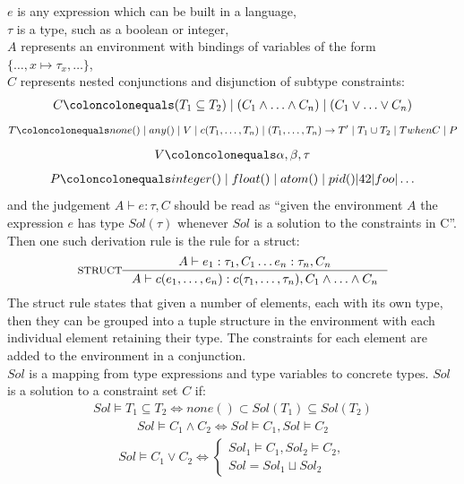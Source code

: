 \documentclass[12pt, titlepage]{article}
\begin{document}
$e$ is any expression which can be built in a language, \\
$\tau$ is a type, such as a boolean or integer, \\
$A$ represents an environment with bindings of variables of the form $\{\ldots, x \mapsto \tau_x, \ldots\}$, \\
$C$ represents nested conjunctions and disjunction of subtype constraints:
\begin{align*} 
	C \coloncolonequals (T_1 \subseteq T_2) \mid (C_1 \land \ldots \land C_n) \mid (C_1 \lor \ldots \lor C_n)
\end{align*}
\begin{align*} 
	T \coloncolonequals none() \mid any() \mid V \mid c(T_1, \ldots, T_n) \mid (T_1, \ldots, T_n) \rightarrow T'\mid T_1 \cup T_2 \mid T when C \mid P
\end{align*}
\begin{align*} 
	V \coloncolonequals \alpha, \beta, \tau
\end{align*}
\begin{align*} 
	P \coloncolonequals integer() \mid float() \mid atom() \mid pid()| 42 | foo | \ldots
\end{align*}
and the judgement $A \vdash e : \tau, C$ should be read as ``given the environment $A$ the expression $e$ has type $Sol(\tau)$ whenever $Sol$ is a solution to the constraints in C''. \\
Then one such derivation rule is the rule for a struct:
                \[
\inference*[STRUCT]{  A \vdash  e_1 : \tau_1, C_1 \ldots e_n : \tau_n, C_n}
                                        {A \vdash  c(e_1, \ldots, e_n) : c(\tau_1, \ldots, \tau_n), C_1 \land \ldots \land C_n}
                \]
The struct rule states that given a number of elements, each with its own type, then they can be grouped into a tuple structure in the environment with each individual element retaining their type. The constraints for each element are added to the environment in a conjunction. \\
$Sol$ is a mapping from type expressions and type variables to concrete types. $Sol$ is a solution to a constraint set $C$ if:
\begin{align*} 
	Sol \models T_1 \subseteq T_2 \iff none() \subset Sol(T_1) \subseteq Sol(T_2)
\end{align*}
\begin{align*} 
	Sol \models C_1 \land C_2 \iff Sol \models C_1, Sol \models  C_2
\end{align*}
\begin{align*} 
	Sol \models C_1 \lor C_2 \iff \begin{cases} Sol_1 \models C_1, Sol_2 \models C_2, \\
	                                            Sol = Sol_1 \sqcup Sol_2 \end{cases}
\end{align*}
\end{document}
